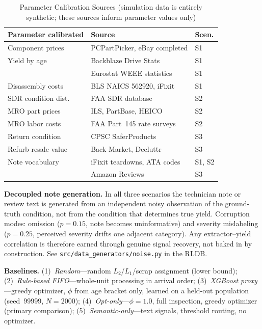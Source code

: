 \documentclass[conference]{IEEEtran}
\begin{document}
\begin{table}[!t]
\caption{Parameter Calibration Sources (simulation data is entirely synthetic;
  these sources inform parameter values only)}
\label{tab:datasources}
\centering\small
\begin{tabular}{lll}
\toprule
Parameter calibrated & Source & Scen. \\
\midrule
Component prices    & PCPartPicker, eBay completed  & S1 \\
Yield by age        & Backblaze Drive Stats~\cite{Backblaze} & S1 \\
                    & Eurostat WEEE statistics      & S1 \\
Disassembly costs   & BLS NAICS 562920, iFixit      & S1 \\
SDR condition dist. & FAA SDR database~\cite{FAASDR}& S2 \\
MRO part prices     & ILS, PartBase, HEICO          & S2 \\
MRO labor costs     & FAA Part~145 rate surveys     & S2 \\
Return condition    & CPSC SaferProducts~\cite{CPSC}& S3 \\
Refurb resale value & Back Market, Decluttr         & S3 \\
Note vocabulary     & iFixit teardowns, ATA codes   & S1, S2 \\
                    & Amazon Reviews~\cite{Hou2024} & S3 \\
\bottomrule
\end{tabular}
\end{table}

\smallskip\noindent\textbf{Decoupled note generation.}
In all three scenarios the technician note or review text is generated from an
independent noisy observation of the ground-truth condition, not from the
condition that determines true yield. Corruption modes: omission ($p{=}0.15$,
note becomes uninformative) and severity mislabeling ($p{=}0.25$, perceived
severity drifts one adjacent category). Any extractor--yield correlation is
therefore earned through genuine signal recovery, not baked in by construction.
See \texttt{src/data\_generators/noise.py} in the RLDB.

\smallskip\noindent\textbf{Baselines.}
(1)~\emph{Random}---random $L_2$/$L_1$/scrap assignment (lower bound);
(2)~\emph{Rule-based FIFO}---whole-unit processing in arrival order;
(3)~\emph{XGBoost proxy}---greedy optimizer, $\phi$ from age bracket only,
learned on a held-out population (seed~99999, $N{=}2000$);
(4)~\emph{Opt-only}---$\phi{=}1.0$, full inspection, greedy optimizer
(primary comparison); (5)~\emph{Semantic-only}---text signals, threshold
routing, no optimizer.
\end{document}
